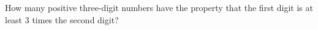 How many positive three-digit numbers have the property that the first digit is at least $3$ times the second digit?
